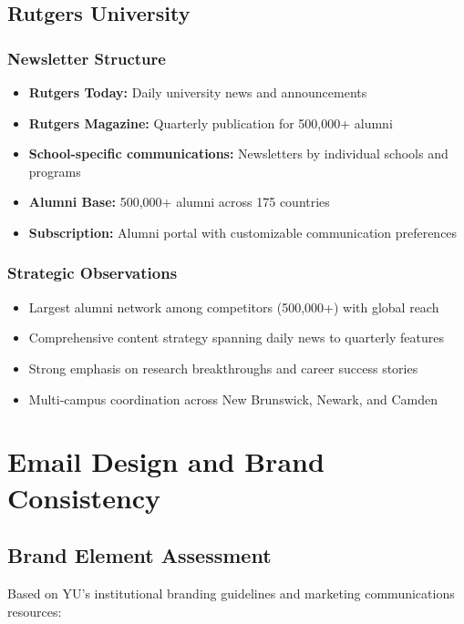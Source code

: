 \documentclass[12pt,letterpaper]{article}
\begin{document}
\subsection{Rutgers University}

\subsubsection{Newsletter Structure}
\begin{itemize}[leftmargin=*]
    \item \textbf{Rutgers Today:} Daily university news and announcements
    \item \textbf{Rutgers Magazine:} Quarterly publication for 500,000+ alumni
    \item \textbf{School-specific communications:} Newsletters by individual schools and programs
    \item \textbf{Alumni Base:} 500,000+ alumni across 175 countries
    \item \textbf{Subscription:} Alumni portal with customizable communication preferences
\end{itemize}

\subsubsection{Strategic Observations}
\begin{itemize}[leftmargin=*]
    \item Largest alumni network among competitors (500,000+) with global reach
    \item Comprehensive content strategy spanning daily news to quarterly features
    \item Strong emphasis on research breakthroughs and career success stories
    \item Multi-campus coordination across New Brunswick, Newark, and Camden
\end{itemize}

\section{Email Design and Brand Consistency}

\subsection{Brand Element Assessment}

Based on YU's institutional branding guidelines and marketing communications resources:
\end{document}
